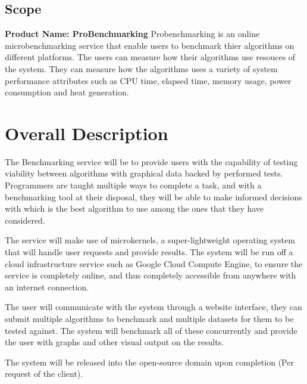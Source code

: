 \documentclass[runningheads,a4paper]{article}
\begin{document}
\subsection{Scope}
	{\bf Product Name: ProBenchmarking}\newline
	Probenchmarking is an online microbenchmarking service that enable users to benchmark thier algorithms
	on different platforms. The users can measure how their algorithms use resouces of the system. 
	They can measure how the algorithms uses a variety of system performance attributes such as CPU time, elapsed time,
	memory usage, power consumption and heat generation.

\section{Overall Description}
    \begin{flushleft}
	The Benchmarking service will be to provide users with the capability of testing viability between algorithms with graphical data backed by performed tests. Programmers are taught multiple ways to complete a task, and with a benchmarking tool at their disposal, they will be able to make informed decisions with which is the best algorithm to use among the ones that they have considered. 
	\end{flushleft}
	\newline
	\begin{flushleft}
    The service will make use of microkernels, a super-lightweight operating system that will handle user requests and provide results. The system will be run off a cloud infrastructure service such as Google Cloud Compute Engine, to ensure the service is completely online, and thus completely accessible from anywhere with an internet connection.
    \end{flushleft}
    \newline
    \begin{flushleft}	
	The user will communicate with the system through a website interface, they can submit multiple algorithms to benchmark and multiple datasets for them to be tested against. The system will benchmark all of these concurrently and provide the user with graphs and other visual output on the results. \newline
	
	The system will be released into the open-source domain upon completion (Per request of the client). \newline
    \end{flushleft}
\end{document}
